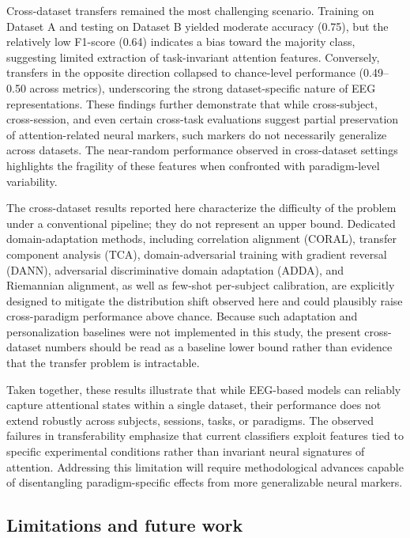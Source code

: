 \documentclass[10pt,letterpaper]{article}
\newcommand{\rev}[1]{\par\noindent\colorbox{yellow}{\parbox{\dimexpr\linewidth-2\fboxsep\relax}{#1}}\par}
\newcommand{\revs}[1]{\colorbox{yellow}{#1}}
\renewcommand{\rev}[1]{#1}
\renewcommand{\revs}[1]{#1}
\begin{document}
Cross-dataset transfers remained the most challenging scenario. Training on Dataset A and testing on Dataset B yielded moderate accuracy (0.75), but the relatively low F1-score (0.64) indicates a bias toward the majority class, suggesting limited extraction of task-invariant attention features. Conversely, transfers in the opposite direction collapsed to chance-level performance (0.49--0.50 across metrics), underscoring the strong dataset-specific nature of EEG representations. These findings further demonstrate that while cross-subject, cross-session, and even certain cross-task evaluations suggest partial preservation of attention-related neural markers, such markers do not necessarily generalize across datasets. The near-random performance observed in cross-dataset settings highlights the fragility of these features when confronted with paradigm-level variability.

\rev{The cross-dataset results reported here characterize the difficulty of the problem under a conventional pipeline; they do not represent an upper bound. Dedicated domain-adaptation methods, including correlation alignment (CORAL), transfer component analysis (TCA), domain-adversarial training with gradient reversal (DANN), adversarial discriminative domain adaptation (ADDA), and Riemannian alignment, as well as few-shot per-subject calibration, are explicitly designed to mitigate the distribution shift observed here and could plausibly raise cross-paradigm performance above chance. Because such adaptation and personalization baselines were not implemented in this study, the present cross-dataset numbers should be read as a baseline lower bound rather than evidence that the transfer problem is intractable.}

Taken together, these results illustrate that while EEG-based models can reliably capture attentional states within a single dataset, their performance does not extend robustly across subjects, sessions, tasks, or paradigms. The observed failures in transferability emphasize that current classifiers exploit features tied to specific experimental conditions rather than invariant neural signatures of attention. Addressing this limitation will require methodological advances capable of disentangling paradigm-specific effects from more generalizable neural markers.

\subsection*{\revs{Limitations and future work}}
\end{document}
